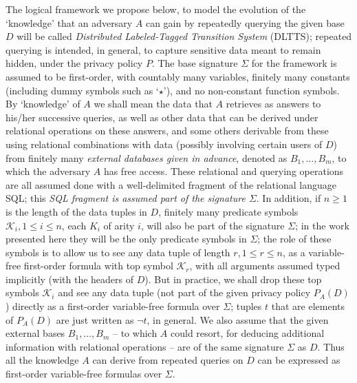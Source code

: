 \documentclass[pdflatex]{article}
\def \K {{\mathcal{K}}}
\begin{document}
The logical framework we propose below, to model the evolution of the `knowledge'
that an adversary $A$ can gain by repeatedly querying the given base $D$ 
will be called  {\em Distributed Labeled-Tagged Transition  System} (DLTTS); repeated 
querying is  intended, in general, to capture sensitive data meant to  remain hidden,
under the privacy policy $P$. The base signature $\Sigma$ for the framework is assumed
to be first-order, with countably many variables, finitely many constants
(including dummy symbols such as `$\star$'), and  no non-constant function symbols.
By `knowledge' of $A$ we shall mean the data that $A$ retrieves as answers to
his/her successive queries, as well as other data that can be derived under
relational operations on these answers, and some others derivable from these using
relational combinations with data (possibly involving certain users of $D$) from
finitely many {\em external  databases  given in advance}, denoted as $B_1, \dots, B_m$,
to which the adversary $A$ has free access. These relational and querying
operations are all assumed done with a well-delimited fragment of the relational 
language SQL; this  {\em SQL fragment is assumed part of the signature  $\Sigma$}. 
In addition, if $n \ge 1$ is the length of the data tuples  in $D$,
finitely many predicate symbols $\K_i, 1 \le i \le n$, each $K_i$ of arity $i$,  will also
be part of the signature $\Sigma$; in the work presented here they will be the only
predicate symbols in $\Sigma$; the role of these symbols is  to allow us to see any data
tuple of length $r, 1 \le r \le n$, as a variable-free first-order formula with top symbol
$\K_r$, with all arguments assumed typed implicitly (with the headers of $D$).
But in practice, we shall drop these top symbols $\K_i$ and see any data tuple
(not part of the given privacy policy $P_A(D)$) directly as a first-order variable-free
formula over $\Sigma$; tuples $t$ that are elements of  $P_A(D)$ are just
written as $\neg t$, in general.  
 We  also assume that  the given external bases $B_1, \dots, B_m$ -- to which $A$
 could resort, for deducing additional information with relational operations -- are 
 of the same  signature $\Sigma$ as $D$. Thus  all the knowledge $A$ can derive 
 from repeated queries on $D$ can be expressed as first-order variable-free
 formulas  over $\Sigma$.  
\end{document}
